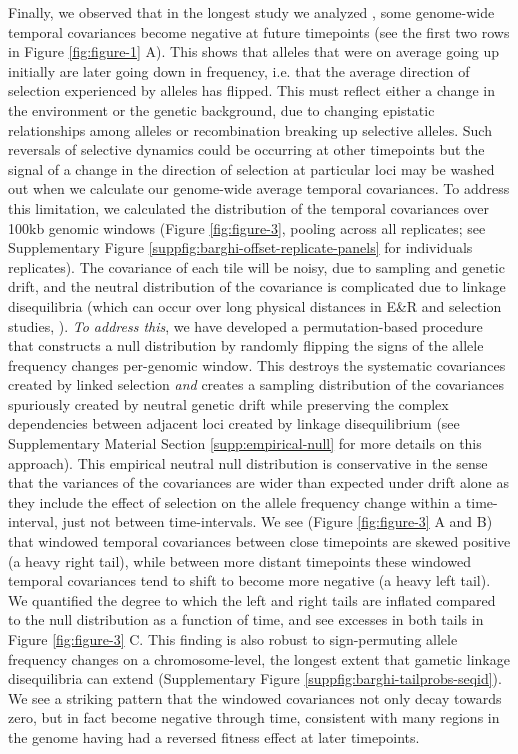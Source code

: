 \documentclass[11pt]{article}
\newcommand{\vb}[1]{{\it \color{blue} #1}}
\begin{document}
Finally, we observed that in the longest study  we analyzed
\parencite{Barghi2019-qy}, some genome-wide temporal covariances become
negative at future timepoints (see the first two rows in Figure
\ref{fig:figure-1} A). This shows that alleles that were on average going up
initially are later going down in frequency, i.e. that the average direction of
selection experienced by alleles has flipped. This must reflect either a change
in the environment or the genetic background, due to changing epistatic
relationships among alleles or  recombination breaking up selective alleles.
Such reversals of selective dynamics could be occurring at other timepoints but
the signal of a change in the direction of selection at particular loci may be
washed out when we calculate our genome-wide average temporal covariances.  To
address this limitation, we calculated the distribution of the temporal
covariances over 100kb genomic windows (Figure \ref{fig:figure-3}, pooling
across all replicates; see Supplementary Figure
\ref{suppfig:barghi-offset-replicate-panels} for individuals replicates). The
covariance of each tile will be noisy, due to sampling and genetic drift, and
the neutral distribution of the covariance is complicated due to linkage
disequilibria (which can occur over long physical distances in E\&R and
selection studies, \cite{Nuzhdin2013-gf,Baldwin-Brown2014-cl}). \vb{To address
this}, we have developed a permutation-based procedure that constructs a null
distribution by randomly flipping the signs of the   allele frequency changes
per-genomic window. This destroys the systematic covariances created by linked
selection \vb{and} creates a sampling distribution of the covariances
spuriously created by neutral genetic drift while preserving the complex
dependencies between adjacent loci created by linkage disequilibrium (see
Supplementary Material Section \ref{supp:empirical-null} for more details on
this approach). This empirical neutral null distribution is conservative in
the sense that the variances of the covariances are wider than expected under
drift alone as they include the effect of selection on the allele frequency
change within a time-interval, just not between time-intervals. We see (Figure
\ref{fig:figure-3} A and B) that windowed temporal covariances between close
timepoints are skewed positive (a heavy right tail), while between more distant
timepoints these windowed temporal covariances tend to shift to become more
negative (a heavy left tail).  We quantified the degree to which the left and
right tails are inflated compared to the null distribution as a function of
time, and see excesses in both tails in Figure \ref{fig:figure-3} C. This
finding is also robust to sign-permuting allele frequency changes on a
chromosome-level, the longest extent that gametic linkage disequilibria can
extend (Supplementary Figure \ref{suppfig:barghi-tailprobs-seqid}). We see a
striking pattern that the windowed covariances not only decay towards zero, but
in fact become negative through time, consistent with many regions in the
genome having had a reversed fitness effect at later timepoints.
\end{document}
